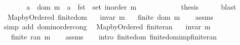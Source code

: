 \begin{isabellebody}
\ \ \ \ \isamarkupfalse%
\ \isamarkupfalse%
\ {\isachardoublequoteopen}a\ {\isasymin}\ dom\ m\ {\isasymlongleftrightarrow}\ a\ {\isasymin}\ fst\ {\isacharbackquote}{\kern0pt}\ set\ {\isacharparenleft}{\kern0pt}inorder\ m{\isacharparenright}{\kern0pt}{\isachardoublequoteclose}\isanewline
\ \ \ \ \ \ \isacommand{{\isachardot}{\kern0pt}}\isamarkupfalse%
\ \isacommand{{\isacharbraceright}{\kern0pt}}\isamarkupfalse%
\isanewline
\ \ \isamarkupfalse%
\ {\isacharquery}{\kern0pt}thesis\isanewline
\ \ \ \ \isamarkupfalse%
\ blast\isanewline
{}\isamarkupfalse%
%
\endisatagproof
{\isafoldproof}%
%
\isadelimproof
\isanewline
%
\endisadelimproof
\isanewline
{}\isamarkupfalse%
\ {\isacharparenleft}{\kern0pt}\ Map{\isacharunderscore}{\kern0pt}by{\isacharunderscore}{\kern0pt}Ordered{\isacharparenright}{\kern0pt}\ finite{\isacharunderscore}{\kern0pt}dom{\isacharcolon}{\kern0pt}\isanewline
\ \ \ {\isachardoublequoteopen}invar\ m{\isachardoublequoteclose}\isanewline
\ \ \ {\isachardoublequoteopen}finite\ {\isacharparenleft}{\kern0pt}dom\ m{\isacharparenright}{\kern0pt}{\isachardoublequoteclose}\isanewline
%
\isadelimproof
\ \ %
\endisadelimproof
%
\isatagproof
{}\isamarkupfalse%
\ assms\isanewline
\ \ \isamarkupfalse%
\ {\isacharparenleft}{\kern0pt}simp\ add{\isacharcolon}{\kern0pt}\ dom{\isacharunderscore}{\kern0pt}inorder{\isacharunderscore}{\kern0pt}cong{\isacharparenright}{\kern0pt}%
\endisatagproof
{\isafoldproof}%
%
\isadelimproof
\isanewline
%
\endisadelimproof
\isanewline
{}\isamarkupfalse%
\ {\isacharparenleft}{\kern0pt}\ Map{\isacharunderscore}{\kern0pt}by{\isacharunderscore}{\kern0pt}Ordered{\isacharparenright}{\kern0pt}\ finite{\isacharunderscore}{\kern0pt}ran{\isacharcolon}{\kern0pt}\isanewline
\ \ \ {\isachardoublequoteopen}invar\ m{\isachardoublequoteclose}\isanewline
\ \ \ {\isachardoublequoteopen}finite\ {\isacharparenleft}{\kern0pt}ran\ m{\isacharparenright}{\kern0pt}{\isachardoublequoteclose}\isanewline
%
\isadelimproof
\ \ %
\endisadelimproof
%
\isatagproof
{}\isamarkupfalse%
\ assms\isanewline
\ \ \isamarkupfalse%
\ {\isacharparenleft}{\kern0pt}intro\ finite{\isacharunderscore}{\kern0pt}dom\ finite{\isacharunderscore}{\kern0pt}dom{\isacharunderscore}{\kern0pt}imp{\isacharunderscore}{\kern0pt}finite{\isacharunderscore}{\kern0pt}ran{\isacharparenright}{\kern0pt}%
\endisatagproof

\end{isabellebody}
